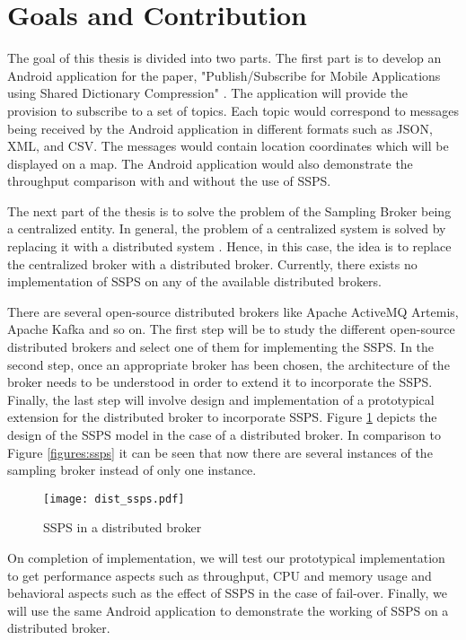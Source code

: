 \section{Goals and Contribution}

The goal of this thesis is divided into two parts. The first part is to develop an Android application for the paper, "Publish/Subscribe for Mobile Applications using Shared Dictionary Compression" \parencite{sdcdemo}. The application will provide the provision to subscribe to a set of topics. Each topic would correspond to messages being received by the Android application in different formats such as JSON, XML, and CSV. The messages would contain location coordinates which will be displayed on a map. The Android application would also demonstrate the throughput comparison with and without the use of SSPS.

The next part of the thesis is to solve the problem of the Sampling Broker being a centralized entity. In general, the problem of a centralized system is solved by replacing it with a distributed system \parencite{tanenbaum2007distributed}. Hence, in this case, the idea is to replace the centralized broker with a distributed broker. Currently, there exists no implementation of SSPS on any of the available distributed brokers.

There are several open-source distributed brokers like Apache ActiveMQ Artemis, Apache Kafka and so on. The first step will be to study the different open-source distributed brokers and select one of them for implementing the SSPS. In the second step, once an appropriate broker has been chosen, the architecture of the broker needs to be understood in order to extend it to incorporate the SSPS. Finally, the last step will involve design and implementation of a prototypical extension for the distributed broker to incorporate SSPS. Figure \ref{figures:dist_ssps} depicts the design of the SSPS model in the case of a distributed broker. In comparison to Figure \ref{figures:ssps} it can be seen that now there are several instances of the sampling broker instead of only one instance.

\makeatletter
\setlength{\@fptop}{0pt}
\makeatother

\begin{figure}[t!]
\centering
\texttt{[image: dist\_ssps.pdf]}
\caption{SSPS in a distributed broker}\label{figures:dist_ssps}
\end{figure}

On completion of implementation, we will test our prototypical implementation to get performance aspects such as throughput, CPU and memory usage and behavioral aspects such as the effect of SSPS in the case of fail-over. Finally, we will use the same Android application to demonstrate the working of SSPS on a distributed broker.
